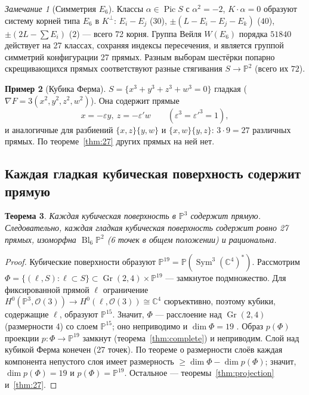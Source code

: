 \documentclass[11pt,a4paper]{article}
\theoremstyle{plain}
\newtheorem{theorem}{Теорема}[section]
\theoremstyle{definition}
\newtheorem{example}[theorem]{Пример}
\theoremstyle{remark}
\newtheorem{remark}[theorem]{Замечание}
\renewcommand{\C}{\mathbb{C}}
\newcommand{\PP}{\mathbb{P}}
\newcommand{\cO}{\mathcal{O}}
\DeclareMathOperator{\Pic}{Pic}
\DeclareMathOperator{\Gr}{Gr}
\DeclareMathOperator{\Bl}{Bl}
\DeclareMathOperator{\Sym}{Sym}
\begin{document}
\begin{remark}[Симметрия $E_6$]
Классы $\alpha\in\Pic S$ с $\alpha^2=-2$, $K\cdot\alpha=0$ образуют систему корней типа $E_6$ в $K^\perp$:
$E_i-E_j$ ($30$), $\pm(L-E_i-E_j-E_k)$ ($40$), $\pm(2L-\sum E_i)$ ($2$) --- всего 72 корня. Группа Вейля
$W(E_6)$ порядка $51840$ действует на 27 классах, сохраняя индексы пересечения, и является группой симметрий
конфигурации 27 прямых. Разным выборам шестёрки попарно скрещивающихся прямых соответствуют разные
стягивания $S\to\PP^2$ (всего их $72$).
\end{remark}

\begin{example}[Кубика Ферма]
$S=\{x^3+y^3+z^3+w^3=0\}$ гладкая ($\nabla F=3(x^2,y^2,z^2,w^2)$). Она содержит прямые
\[
x=-\varepsilon y,\ z=-\varepsilon'w\qquad(\varepsilon^3=\varepsilon'^3=1),
\]
и аналогичные для разбиений $\{x,z\}\{y,w\}$ и $\{x,w\}\{y,z\}$: $3\cdot9=27$ различных прямых. По
теореме~\ref{thm:27} других прямых на ней нет.
\end{example}

\subsection{Каждая гладкая кубическая поверхность содержит прямую}\label{ss:existence}

\begin{theorem}
Каждая кубическая поверхность в $\PP^3$ содержит прямую. Следовательно, каждая гладкая кубическая поверхность
содержит ровно 27 прямых, изоморфна $\Bl_6\PP^2$ (6 точек в общем положении) и рациональна.
\end{theorem}
\begin{proof}
Кубические поверхности образуют $\PP^{19}=\PP(\Sym^3(\C^4)^*)$. Рассмотрим
$\Phi=\{(\ell,S):\ell\subset S\}\subset\Gr(2,4)\times\PP^{19}$ --- замкнутое подмножество. Для фиксированной прямой
$\ell$ ограничение $H^0(\PP^3,\cO(3))\to H^0(\ell,\cO(3))\cong\C^4$ сюръективно, поэтому кубики, содержащие $\ell$,
образуют $\PP^{15}$. Значит, $\Phi$ --- расслоение над $\Gr(2,4)$ (размерности 4) со слоем $\PP^{15}$; оно
неприводимо и $\dim\Phi=19$ \cite[I.6.3, Теорема~8]{Sh}. Образ $p(\Phi)$ проекции $p\colon\Phi\to\PP^{19}$ замкнут
(теорема~\ref{thm:complete}) и неприводим. Слой над кубикой Ферма конечен (27 точек). По теореме о размерности слоёв
каждая компонента непустого слоя имеет размерность $\ge\dim\Phi-\dim p(\Phi)$; значит, $\dim p(\Phi)=19$ и
$p(\Phi)=\PP^{19}$. Остальное --- теоремы~\ref{thm:projection} и~\ref{thm:27}.
\end{proof}
\end{document}
